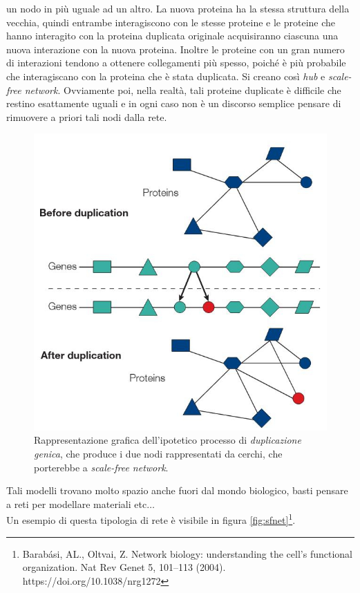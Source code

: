 \documentclass[a4paper,12pt, oneside]{book}
\begin{document}
un nodo in più uguale ad un altro. La nuova proteina ha la stessa struttura
della vecchia, quindi entrambe interagiscono con le stesse proteine e le
proteine che hanno interagito con la proteina duplicata originale acquisiranno
ciascuna una nuova interazione con la nuova proteina. Inoltre le proteine con un
gran numero di interazioni tendono a ottenere collegamenti più spesso, poiché è
più probabile che interagiscano con la proteina che è stata
duplicata. Si creano così \textit{hub} e \textit{scale-free network}. Ovviamente
poi, nella realtà, tali proteine duplicate è difficile che 
restino esattamente uguali e in ogni caso non è un discorso semplice pensare di
rimuovere a priori tali nodi dalla rete.\\
\begin{figure}
  \centering
  \includegraphics[scale = 1.5]{img/dup.jpg}
  \caption{Rappresentazione grafica dell'ipotetico processo di
    \textit{duplicazione genica}, che produce i due nodi rappresentati da
    cerchi, che porterebbe a \textit{scale-free network}.}  
  \label{fig:dup}
\end{figure}
Tali modelli trovano molto spazio anche fuori dal mondo biologico, basti
pensare a reti per modellare materiali etc$\ldots$\\
Un esempio di questa tipologia di rete è visibile in figura
\ref{fig:sfnet}\footnote{Barabási, AL., Oltvai, Z. Network biology: understanding
  the cell's functional organization. Nat Rev Genet 5, 101–113
  (2004). https://doi.org/10.1038/nrg1272}.
\end{document}
